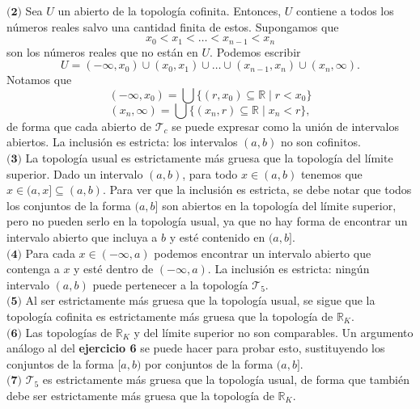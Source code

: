 \documentclass{article}
\begin{document}
$\textbf{(2)}$ Sea $U$ un abierto de la topología cofinita. Entonces, $U$ contiene a todos los números reales salvo una cantidad finita de estos.  Supongamos que 
$$ x_{0} < x_{1} < \ldots < x_{n-1} < x_{n} $$
son los números reales que no están en $U$. Podemos escribir
$$ U = (-\infty, x_{0}) \cup (x_{0}, x_{1}) \cup \ldots \cup (x_{n-1}, x_{n}) \cup (x_{n}, \infty). $$
Notamos que 
$$ (-\infty, x_{0}) = \bigcup \{ (r, x_{0}) \subseteq \mathbb{R} \mid r < x_{0} \} $$
$$(x_{n},\infty) = \bigcup \{ (x_{n}, r) \subseteq \mathbb{R} \mid x_{n} < r  \}, $$
de forma que cada abierto de $\mathcal{T}_{c}$ se puede expresar como la unión de intervalos abiertos. La inclusión es estricta: los intervalos $(a, b)$ no son cofinitos. \\

$\textbf{(3)}$ La topología usual es estrictamente más gruesa que la topología del límite superior. Dado un intervalo $(a, b)$, para todo $x \in (a, b)$ tenemos que $x \in (a, x] \subseteq (a, b)$. Para ver que la inclusión es estricta, se debe notar que todos los conjuntos de la forma $(a, b]$ son abiertos en la topología del límite superior, pero no pueden serlo en la topología usual, ya que no hay forma de encontrar un intervalo abierto que incluya a $b$ y esté contenido en $(a, b]$. \\

$\textbf{(4)}$ Para cada $x \in (-\infty, a)$ podemos encontrar un intervalo abierto que contenga a $x$ y esté dentro de $(-\infty, a)$. La inclusión es estricta: ningún intervalo $(a, b)$ puede pertenecer a la topología $\mathcal{T}_{5}$. \\

$\textbf{(5)}$ Al ser estrictamente más gruesa que la topología usual, se sigue que la topología cofinita es estrictamente más gruesa que la topología de $\mathbb{R}_{K}$.\\

$\textbf{(6)}$ Las topologías de $\mathbb{R}_{K}$ y del límite superior no son comparables. Un argumento análogo al del \textbf{ejercicio 6} se puede hacer para probar esto, sustituyendo los conjuntos de la forma $[a,b)$ por conjuntos de la forma $(a,b]$. \\

$\textbf{(7)}$ $\mathcal{T}_{5}$ es estrictamente más gruesa que la topología usual, de forma que también debe ser estrictamente más gruesa que la topología de $\mathbb{R}_{K}$. \\
\end{document}
